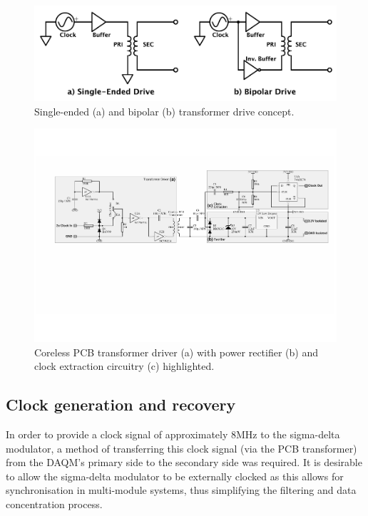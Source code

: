\documentclass[conference]{IEEEtran}
\begin{document}
	\begin{figure}[t]
		\centering
		\includegraphics[width=0.9\columnwidth]{./img/BIvsSE}
		\caption{Single-ended (a) and bipolar (b) transformer drive concept.}
		\label{fig:BIvsSE}
	\end{figure}
%	
	\begin{figure}[t]
		\centering
		\includegraphics[width=1.0\textwidth]{./img/TFpwrclk_BW}
		\caption{Coreless PCB transformer driver (a) with power rectifier (b) and clock extraction circuitry (c) highlighted.}
		\label{fig:TFpwrclk}
	\end{figure}	
	
	\subsection{Clock generation and recovery}
	In order to provide a clock signal of approximately 8MHz to the sigma-delta modulator, a method of transferring this clock signal (via the PCB transformer) from the DAQM's primary side to the secondary side was required.  It is desirable to allow the sigma-delta modulator to be externally clocked as this allows for synchronisation in multi-module systems, thus simplifying the filtering and data concentration process.  
	
\end{document}
